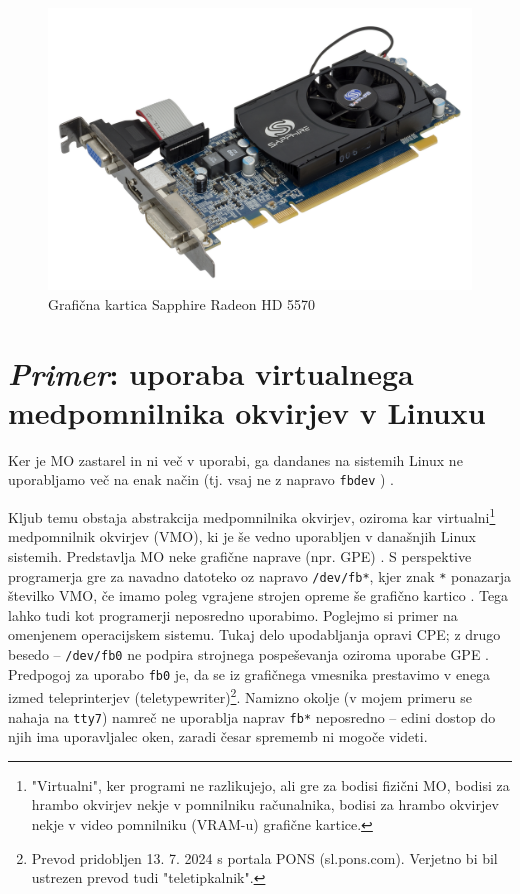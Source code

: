 \documentclass{article}
\begin{document}
\begin{figure}[H]
    \centering
    \includegraphics[width=0.75\linewidth]{Sapphire-Radeon-HD-5570-Video-Card}
    \caption{Grafična kartica Sapphire Radeon HD 5570 \autocite{fig:sapphireradeon}}
\end{figure}

\section{\textit{Primer}: uporaba virtualnega medpomnilnika okvirjev v Linuxu}
Ker je MO zastarel in ni več v uporabi, ga dandanes na sistemih Linux ne uporabljamo več na enak način (tj. vsaj ne z napravo \texttt{fbdev} \autocite{forbiddenprojects}) \autocite{ffmpeg}.

Kljub temu obstaja abstrakcija medpomnilnika okvirjev, oziroma kar virtualni\footnote{"Virtualni", ker programi ne razlikujejo, ali gre za bodisi fizični MO, bodisi za hrambo okvirjev nekje v pomnilniku računalnika, bodisi za hrambo okvirjev nekje v video pomnilniku (VRAM-u) grafične kartice.} medpomnilnik okvirjev (VMO), ki je še vedno uporabljen v današnjih Linux sistemih. Predstavlja MO neke grafične naprave (npr. GPE) \autocite{fbdevdocs}. S perspektive programerja gre za navadno datoteko oz napravo \texttt{/dev/fb*}, kjer znak \texttt{*} ponazarja številko VMO, če imamo poleg vgrajene strojen opreme še grafično kartico \autocite{fbdevdocs}. Tega lahko tudi kot programerji neposredno uporabimo. Poglejmo si primer na omenjenem operacijskem sistemu. Tukaj delo upodabljanja opravi CPE; z drugo besedo -- \texttt{/dev/fb0} ne podpira strojnega pospeševanja oziroma uporabe GPE \autocite{fbdevdocs}.
Predpogoj za uporabo \texttt{fb0} je, da se iz grafičnega vmesnika prestavimo v enega izmed teleprinterjev (teletypewriter)\footnote{Prevod pridobljen 13. 7. 2024 s portala PONS (sl.pons.com). Verjetno bi bil ustrezen prevod tudi "teletipkalnik".}. Namizno okolje (v mojem primeru se nahaja na \texttt{tty7}) namreč ne uporablja naprav \texttt{fb*} neposredno -- edini dostop do njih ima uporavljalec oken, zaradi česar sprememb ni mogoče videti.
\end{document}
